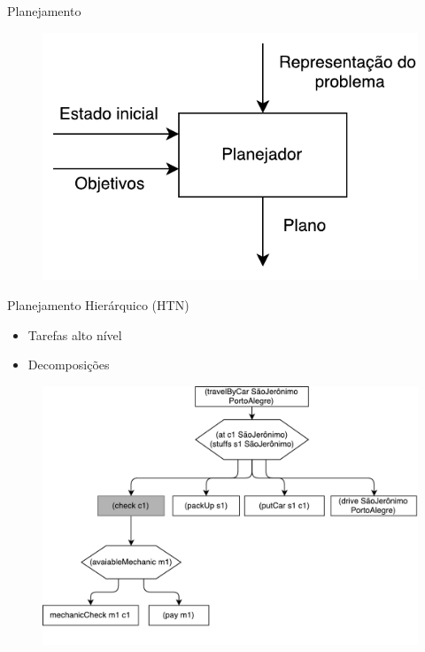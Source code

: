 \documentclass{beamer}
\begin{document}
\begin{frame}{Planejamento}
	
	\vspace{-3mm}
	\begin{figure}[here]
		\includegraphics[width=0.6\linewidth]{fig/modelo.pdf}	
	\end{figure}	
\end{frame}
\begin{frame}{Planejamento Hierárquico (HTN)}
	\begin{itemize}
		\item Tarefas alto nível
		\item Decomposições
	\end{itemize}
	\vspace{-3mm}
	\begin{figure}[here]
		\includegraphics[width=0.7\linewidth]{fig/htnmethodresult.pdf}	
	\end{figure}	
\end{frame}
\end{document}
